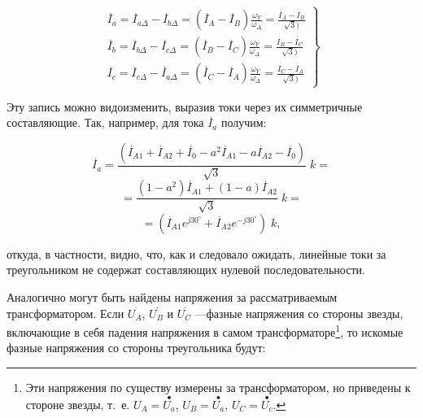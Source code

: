 \begin{equation} %
	\label{eq:13-1 sistem}
	\left.
	\begin{matrix}
        \overset{\;.}{I}_a = \overset{\;.}{I}_{a\Delta} - \overset{\;.}{I}_{b\Delta} = (\overset{\;.}{I}_{A} - \overset{\;.}{I}_{B}) \frac{\omega_{Y}}{\omega_{\Delta}} = \frac{\overset{\;.}{I}_{A} - \overset{\;.}{I}_{B}}{\sqrt{3})} \\ 
        \overset{\;.}{I}_b = \overset{\;.}{I}_{b\Delta} - \overset{\;.}{I}_{c\Delta} = (\overset{\;.}{I}_{B} - \overset{\;.}{I}_{C}) \frac{\omega_{Y}}{\omega_{\Delta}} = \frac{\overset{\;.}{I}_{B} - \overset{\;.}{I}_{C}}{\sqrt{3})} \\ 
        \overset{\;.}{I}_c = \overset{\;.}{I}_{c\Delta} - \overset{\;.}{I}_{a\Delta} = (\overset{\;.}{I}_{C} - \overset{\;.}{I}_{A}) \frac{\omega_{Y}}{\omega_{\Delta}} = \frac{\overset{\;.}{I}_{C} - \overset{\;.}{I}_{A}}{\sqrt{3})}
    \end{matrix}\right\}
\end{equation}

Эту запись можно видоизменить, выразив токи через их симметричные составляющие. Так, например, для тока $ \overset{\;.}{I}_a $ получим:

\begin{equation*} %
    \label{eq:13-2 I_a}
	\overset{\;.}{I}_a = \frac{(\overset{\;.}{I}_{A1} + \overset{\;.}{I}_{A2} + \overset{\;.}{I}_0 - a^2\overset{\;.}{I}_{A1} - a\overset{\;.}{I}_{A2} - \overset{\;.}{I}_0)}{\sqrt{3}}\;k =
\end{equation*}
\begin{equation*}
    = \frac{(1 - a^2) \overset{\;.}{I}_{A1} + (1 - a) \overset{\;.}{I}_{A2}}{\sqrt{3}}\;k =
\end{equation*}    
\begin{equation}	
	= (\overset{\;.}{I}_{A1} e^{j30^\circ} + \overset{\;.}{I}_{A2} e^{-j30^\circ})\;k,
\end{equation}

откуда, в частности, видно, что, как и следовало ожидать, линейные токи за треугольником не содержат составляющих нулевой последовательности.

Аналогично могут быть найдены напряжения за рассматриваемым трансформатором. Если $ \overset{\;.}{U_A} $, $ \overset{\;.}{U_B} $ и $ \overset{\;.}{U_C} $  —фазные напряжения со стороны звезды, включающие в себя падения напряжения в самом трансформаторе\footnote{Эти напряжения по существу измерены за трансформатором, но приведены к стороне звезды, т.~е. $ U_A = \overset{\bullet}{U_a} $, $ U_B = \overset{\bullet}{U_a} $, $ U_C = \overset{\bullet}{U_c} $.}, то искомые фазные напряжения со стороны треугольника будут:

